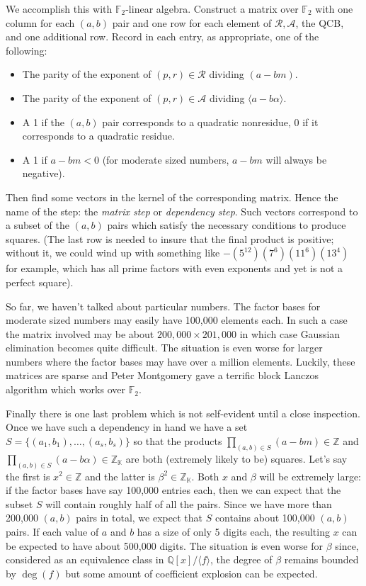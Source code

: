 \documentclass[12pt]{article}
\newcommand{\F}{\mathbb{F}}
\newcommand{\K}{\mathbb{K}}
\newcommand{\Z}{\mathbb{Z}}
\newcommand{\Q}{\mathbb{Q}}
\newcommand{\rfb}{\mathcal{R}}
\newcommand{\afb}{\mathcal{A}}
\newcommand{\ideal}[1]{{\langle #1 \rangle}}
\begin{document}
  We accomplish this with $\F_2$-linear algebra. Construct a matrix
  over $\F_2$ with one column for each $(a,b)$ pair and one
  row for each element of $\rfb, \afb$, the QCB, and one additional
  row. Record in each entry, as appropriate, one of the following:
  \begin{itemize}
    \item
      The parity of the exponent of $(p,r)\in\rfb$ dividing 
      $(a-bm)$.
    \item
      The parity of the exponent of $(p,r)\in\afb$ dividing 
      $\ideal{a-b\alpha}$.
    \item 
      A 1 if the $(a,b)$ pair corresponds to a quadratic nonresidue,
      0 if it corresponds to a quadratic residue.
    \item
      A 1 if $a-bm<0$ (for moderate sized numbers, $a-bm$ will always
      be negative).
  \end{itemize}
  Then find some vectors in the kernel of the corresponding
  matrix. Hence the name of the step: the {\em matrix step}
  or {\em dependency step}.
  Such vectors correspond to a subset of the $(a,b)$ pairs
  which satisfy the necessary conditions to produce squares.
  (The last row is needed to insure that the final product is
  positive; without it, we could wind up with something like
  $-(5^{12})(7^6)(11^6)(13^4)$ for example, which has all prime
  factors with even exponents and yet is not a perfect square).

  So far, we haven't talked about particular numbers. The factor
  bases for moderate sized numbers may easily have 100,000 elements
  each. In such a case the matrix involved may be about 
  $200,000\times 201,000$ in which case Gaussian elimination
  becomes quite difficult. The situation is even worse for
  larger numbers where the factor bases may have over a million
  elements. Luckily, these matrices are sparse and Peter Montgomery
  gave a terrific block Lanczos algorithm which works over $\F_2$.


  Finally there is one last problem which is not self-evident
  until a close inspection. Once we have such a dependency in hand
  we have a set $S=\{(a_1,b_1),\ldots , (a_s, b_s)\}$ so that
  the products $\prod_{(a,b)\in S}(a-bm)\in\Z$ and
  $\prod_{(a,b)\in S}(a-b\alpha)\in\Z_\K$ are both (extremely
  likely to be) squares. Let's say the first is $x^2\in\Z$ and the
  latter is $\beta^2\in\Z_\K$. 
  Both $x$ and $\beta$ will
  be extremely large: if the factor bases have say 100,000
  entries each, then we can expect that the subset $S$ will
  contain roughly half of all the pairs. Since we have more than
  200,000 $(a,b)$ pairs in total, we expect that $S$ contains
  about 100,000 $(a,b)$ pairs. If each value of $a$ and $b$ has
  a size of only 5 digits each, the resulting $x$ can be expected
  to have about 500,000 digits. The situation is even worse for
  $\beta$ since, considered as an equivalence class in
  $\Q[x]/\ideal{f}$, the degree of $\beta$ remains bounded by $\deg(f)$
  but some amount of coefficient explosion can be expected.
\end{document}
